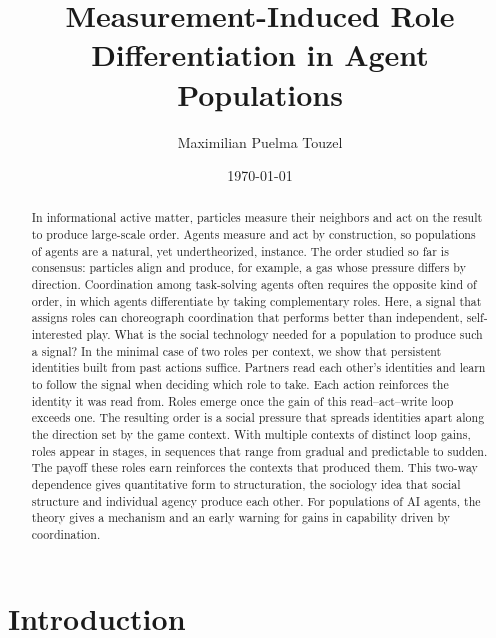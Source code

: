 \documentclass[
  aps,prx,
  reprint,
  superscriptaddress,
  nofootinbib,
  longbibliography
]{revtex4-2}
\begin{document}
\title{Measurement-Induced Role Differentiation in Agent Populations}

\author{Maximilian Puelma Touzel}

\date{\today}

\begin{abstract}
In informational active matter, particles measure their neighbors and act on the result to produce large-scale order. Agents measure and act by construction, so populations of agents are a natural, yet undertheorized, instance. The order studied so far is consensus: particles align and produce, for example, a gas whose pressure differs by direction. Coordination among task-solving agents often requires the opposite kind of order, in which agents differentiate by taking complementary roles. Here, a signal that assigns roles can choreograph coordination that performs better than independent, self-interested play. What is the social technology needed for a population to produce such a signal? In the minimal case of two roles per context, we show that persistent identities built from past actions suffice. Partners read each other's identities and learn to follow the signal when deciding which role to take. Each action reinforces the identity it was read from. Roles emerge once the gain of this read--act--write loop exceeds one. The resulting order is a social pressure that spreads identities apart along the direction set by the game context. With multiple contexts of distinct loop gains, roles appear in stages, in sequences that range from gradual and predictable to sudden. The payoff these roles earn reinforces the contexts that produced them. This two-way dependence gives quantitative form to structuration, the sociology idea that social structure and individual agency produce each other. For populations of AI agents, the theory gives a mechanism and an early warning for gains in capability driven by coordination.
\end{abstract}

\maketitle

\section*{Introduction}
\end{document}
